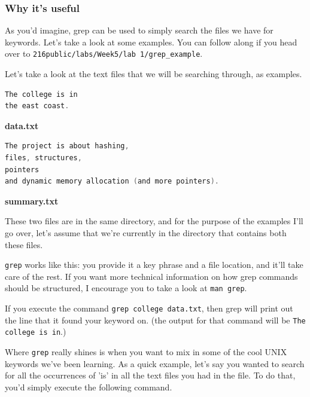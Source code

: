 \documentclass[english, 10pt]{article}
\begin{document}
\subsubsection{Why it's useful}

As you'd imagine, grep can be used to simply search the files we have for keywords. Let's take a look at some examples. You can follow along if you head over to \texttt{216public/labs/Week5/lab 1/grep\_example}.

Let's take a look at the text files that we will be searching through, as examples.

\begin{lstlisting}[language=C]
The college is in
the east coast.  
\end{lstlisting}
\begin{center}
\textbf{data.txt}
\end{center}


\begin{lstlisting}[language=C]
The project is about hashing,
files, structures,
pointers
and dynamic memory allocation (and more pointers).  
\end{lstlisting}
\begin{center}
\textbf{summary.txt}
\end{center}


These two files are in the same directory, and for the purpose of the examples I'll go over, let's assume that we're currently in the directory that contains both these files.\newline

\texttt{grep} works like this: you provide it a key phrase and a file location, and it'll take care of the rest. If you want more technical information on how grep commands should be structured, I encourage you to take a look at \texttt{man grep}. \newline

If you execute the command \texttt{grep college data.txt}, then grep will print out the line that it found your keyword on. (the output for that command will be \texttt{The college is in}.)\newline

Where \texttt{grep} really shines is when you want to mix in some of the cool UNIX keywords we've been learning. As a quick example, let's say you wanted to search for all the occurrences of 'is' in all the text files you had in the file. To do that, you'd simply execute the following command.\newline
\end{document}
